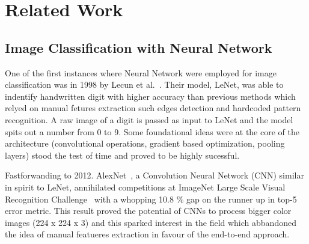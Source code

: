 \chapter{Related Work}
\label{ch:related-work}


\section{Image Classification with Neural Network}
\label{sec:image-classification-with-neural-network}

One of the first instances where Neural Network were employed for image
classification was in 1998 by Lecun et al.~\cite{GradientBasedLecun1998}. Their
model, LeNet, was able to indentify handwritten digit with higher accuracy than
previous methods which relyed on manual fetures extraction such edges detection
and hardcoded pattern recognition. A raw image of a digit is passed as input to LeNet and
the model spits out a number from 0 to 9. Some foundational ideas were at the
core of the architecture (convolutional operations, gradient based
optimization, pooling layers) stood the test of time and proved to be highly
sucessful.

Fastforwanding to 2012. AlexNet~\cite{ImagenetClassiKrizhe2017}, a Convolution
Neural Network (CNN) similar in spirit to LeNet, annihilated competitions at
ImageNet Large Scale Visual Recognition Challenge~\cite{ImagenetALarDeng2009}
with a whopping 10.8 \% gap on the runner up in top-5 error metric. This result
proved the potential of CNNs to process bigger color images (224 x 224 x 3) and
this sparked interest in the field which abbandoned the idea of manual
featueres extraction in favour of the end-to-end approach.



